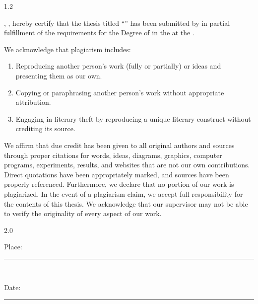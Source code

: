 \begin{spacing}{1.2}

\noindent \pronounwe, \studentnamesdeclaration, hereby certify that the thesis titled \enquote{\ttitle} has been submitted by \pronounour{} in partial fulfillment of the requirements for the Degree of \degreename{} in the \deptname{} at the \univname.

\par
\noindent We acknowledge that plagiarism includes: 
\begin{enumerate} 
    \item Reproducing another person's work (fully or partially) or ideas and presenting them as our own.
    \item Copying or paraphrasing another person's work without appropriate attribution.
    \item Engaging in literary theft by reproducing a unique literary construct without crediting its source.
\end{enumerate}
\par
We affirm that due credit has been given to all original authors and sources through proper citations for words, ideas, diagrams, graphics, computer programs, experiments, results, and websites that are not our own contributions. Direct quotations have been appropriately marked, and sources have been properly referenced. Furthermore, we declare that no portion of our work is plagiarized. In the event of a plagiarism claim, we accept full responsibility for the contents of this thesis. We acknowledge that our supervisor may not be able to verify the originality of every aspect of our work.
\end{spacing}

\begin{spacing}{2.0}
\noindent
\begin{minipage}[t]{0.4\textwidth}  
    \begin{flushleft} 
        Place: \rule{40mm}{0.1pt}\\
    \end{flushleft}
\end{minipage}
\hfill
\begin{minipage}[t]{0.4\textwidth}
    \begin{flushright}         
        Date: \rule{40mm}{0.1pt}\\       
    \end{flushright}
\end{minipage}
\par
{\studentsignatures} %
\end{spacing}


